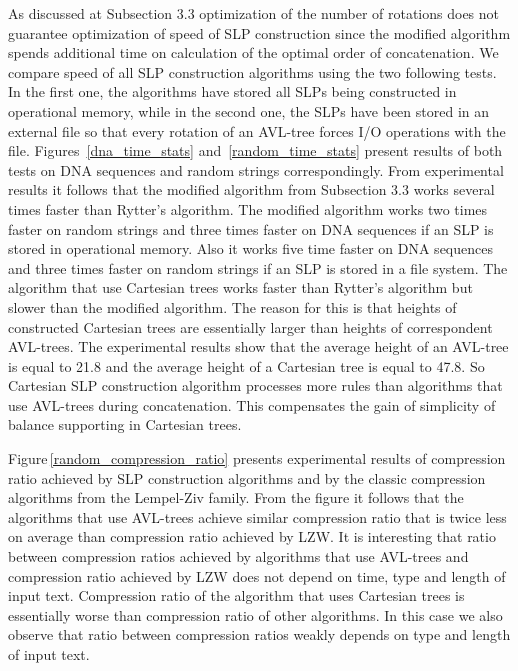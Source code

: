 ﻿\documentclass[11pt]{article}
\theoremstyle{remark}
\begin{document}
As discussed at Subsection 3.3 optimization of the number of rotations does not guarantee optimization of speed of SLP
construction since the modified algorithm spends additional time on calculation of the optimal order of concatenation. We
compare speed of all SLP construction algorithms using the two following tests. In the first one, the algorithms have
stored all SLPs being constructed in operational memory, while in the second one, the SLPs have been stored in an
external file so that every rotation of an AVL-tree forces I/O operations with the file. Figures 
\,\ref{dna_time_stats} and~\ref{random_time_stats} present results of both tests on DNA sequences and random strings
correspondingly. From experimental results it follows that the modified algorithm from Subsection 3.3 works several times faster
than Rytter's algorithm. The modified algorithm works two times faster on random strings and three times faster on DNA
sequences if an SLP is stored in operational memory. Also it works five time faster on DNA sequences and three times
faster on random strings if an SLP is stored in a file system. The algorithm that use Cartesian trees works faster
than Rytter's algorithm but slower than the modified algorithm. The reason for this is that heights of constructed
Cartesian trees are essentially larger than heights of correspondent AVL-trees. The experimental results show that the
average height of an AVL-tree is equal to 21.8 and the average height of a Cartesian tree is equal to 47.8. So Cartesian SLP 
construction algorithm processes more rules than algorithms that use AVL-trees during concatenation.
This compensates the gain of simplicity of balance supporting in Cartesian trees.

Figure\,\ref{random_compression_ratio} presents experimental results of compression ratio achieved by SLP
construction algorithms and by the classic compression algorithms from the Lempel-Ziv family. From the figure it follows that the algorithms that
use AVL-trees achieve similar compression ratio that is twice less on average than compression ratio achieved by LZW.
It is interesting that ratio between compression ratios achieved by algorithms that use AVL-trees and compression ratio
achieved by LZW does not depend on time, type and length of input text. Compression ratio of the algorithm that uses
Cartesian trees is essentially worse than compression ratio of other algorithms. In this case we also observe that
ratio between compression ratios weakly depends on type and length of input text.
\end{document}

